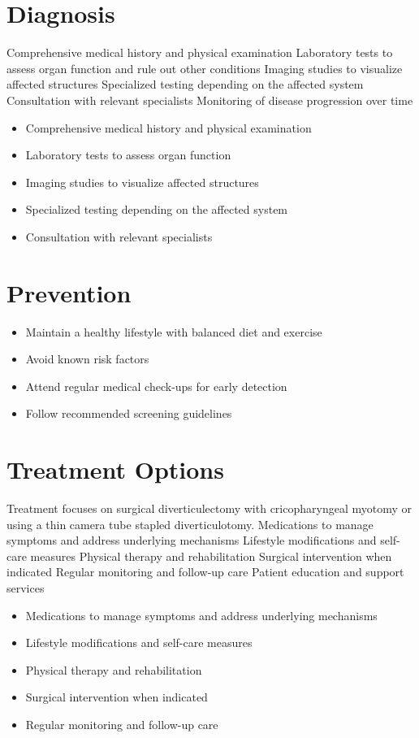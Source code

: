 \section{Diagnosis}
Comprehensive medical history and physical examination Laboratory tests to assess organ function and rule out other conditions Imaging studies to visualize affected structures Specialized testing depending on the affected system Consultation with relevant specialists Monitoring of disease progression over time

\begin{itemize}[noitemsep]
  \item Comprehensive medical history and physical examination
  \item Laboratory tests to assess organ function
  \item Imaging studies to visualize affected structures
  \item Specialized testing depending on the affected system
  \item Consultation with relevant specialists
\end{itemize}
\section{Prevention}
\begin{itemize}[noitemsep]
  \item Maintain a healthy lifestyle with balanced diet and exercise
  \item Avoid known risk factors
  \item Attend regular medical check-ups for early detection
  \item Follow recommended screening guidelines
\end{itemize}
\section{Treatment Options}
Treatment focuses on surgical diverticulectomy with cricopharyngeal myotomy or using a thin camera tube stapled diverticulotomy. Medications to manage symptoms and address underlying mechanisms Lifestyle modifications and self-care measures Physical therapy and rehabilitation Surgical intervention when indicated Regular monitoring and follow-up care Patient education and support services

\begin{itemize}[noitemsep]
  \item Medications to manage symptoms and address underlying mechanisms
  \item Lifestyle modifications and self-care measures
  \item Physical therapy and rehabilitation
  \item Surgical intervention when indicated
  \item Regular monitoring and follow-up care
\end{itemize}
